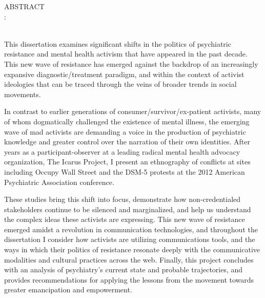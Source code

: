 %
	\tgherosfont

        \begin{center}
	        ABSTRACT \\[0.15in]

               	{\thesisTitle}: {\thesisSubtitle} \\[0.15in]
	        {\thesisName} \\[0.15in]

        \end{center}

\noindent
This dissertation examines significant shifts in the politics of psychiatric resistance and mental health activism that have appeared in the past decade. This new wave of resistance has emerged against the backdrop of an increasingly expansive diagnostic/\allowbreak{}treatment para\-digm, and within the context of activist ideologies that can be traced through the veins of broader trends in social movements.

In contrast to earlier generations of consumer/\allowbreak{}survivor/\allowbreak{}ex-patient activists, many of whom dogmatically challenged the existence of mental illness, the emerging wave of mad activists are demanding a voice in the production of psychiatric knowledge and greater control over the narration of their own identities. After years as a participant-observer at a leading radical mental health advocacy organization, The Icarus Project, I present an ethnography of conflicts at sites including Occupy Wall Street and the DSM-5 protests at the 2012 American Psychiatric Association conference.

These studies bring this shift into focus, demonstrate how non-credentialed stakeholders continue to be silenced and marginalized, and help us understand the complex ideas these activists are expressing. This new wave of resistance emerged amidst a revolution in communication technologies, and throughout the dissertation I consider how activists are utilizing communications tools, and the ways in which their politics of resistance resonate deeply with the communicative modalities and cultural practices across the web. Finally, this project concludes with an analysis of psychiatry’s current state and probable trajectories, and provides recommendations for applying the lessons from the movement towards greater emancipation and empowerment.




